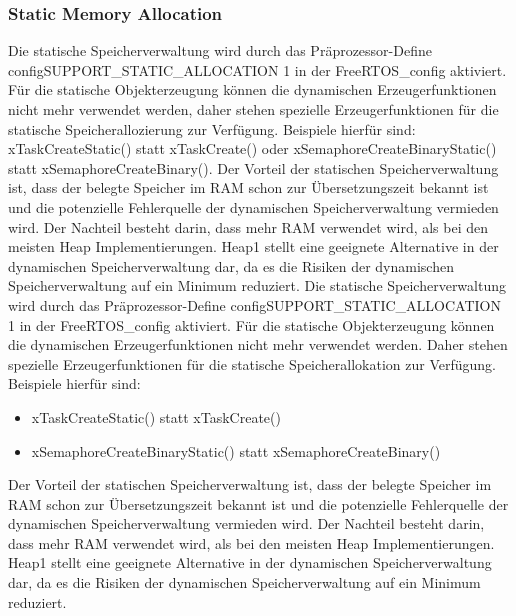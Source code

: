 \subsubsection{Static Memory Allocation}
Die statische Speicherverwaltung wird durch das Prä\-pro\-zes\-sor-Define configSUPPORT\_STATIC\_ALLOCATION 1 in der FreeRTOS\_config aktiviert. Für die statische Objekterzeugung können die dynamischen Erzeugerfunktionen nicht mehr verwendet werden, daher stehen spezielle Erzeugerfunktionen für die statische Speicherallozierung zur Verfügung. Beispiele hierfür sind: xTaskCreateStatic() statt xTaskCreate() oder xSemaphoreCreateBinaryStatic() statt xSemaphoreCreateBinary(). Der Vorteil der statischen Speicherverwaltung ist, dass der belegte Speicher im RAM schon zur Übersetzungszeit bekannt ist und die potenzielle Fehlerquelle der dynamischen Speicherverwaltung vermieden wird. Der Nachteil besteht darin, dass mehr RAM verwendet wird, als bei den meisten Heap Implementierungen. Heap1 stellt eine geeignete Alternative in der dynamischen Speicherverwaltung dar, da es die Risiken der dynamischen Speicherverwaltung auf ein Minimum reduziert.   
Die statische Speicherverwaltung wird durch das Prä\-pro\-zes\-sor-Define configSUPPORT\_STATIC\_ALLOCATION 1 in der FreeRTOS\_config aktiviert. Für die statische Objekterzeugung können die dynamischen Erzeugerfunktionen nicht mehr verwendet werden. Daher stehen spezielle Erzeugerfunktionen für die statische Speicherallokation zur Verfügung. Beispiele hierfür sind: 
\begin{itemize}
	\item xTaskCreateStatic() statt xTaskCreate()
	\item xSemaphoreCreateBinaryStatic() statt xSemaphoreCreateBinary()
\end{itemize}
Der Vorteil der statischen Speicherverwaltung ist, dass der belegte Speicher im RAM schon zur Übersetzungszeit bekannt ist und die potenzielle Fehlerquelle der dynamischen Speicherverwaltung vermieden wird. Der Nachteil besteht darin, dass mehr RAM verwendet wird, als bei den meisten Heap Implementierungen. Heap1 stellt eine geeignete Alternative in der dynamischen Speicherverwaltung dar, da es die Risiken der dynamischen Speicherverwaltung auf ein Minimum reduziert.   